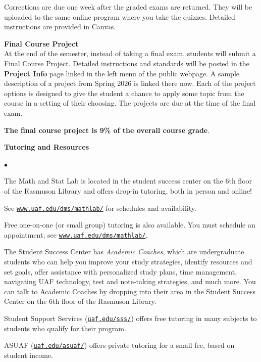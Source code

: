\documentclass[11pt]{article}
\renewcommand{\emph}[1]{\textsf{\textbf{#1}}}
\newcommand{\localhead}[1]{\par\smallskip\textbf{#1} \smallskip\nobreak\\}%
\def\heading#1{\localhead{\large\emph{#1}}}
\newenvironment{clist}%
{\bgroup\parskip 0pt\begin{list}{$\bullet$}{\partopsep 4pt\topsep 0pt\itemsep -2pt}}%
{\end{list}\egroup}%
\begin{document}
Corrections are due one week after the graded exams are returned. They will be uploaded to the same online program where you take the quizzes. Detailed instructions are provided in Canvas.

\heading{Final Course Project}
At the end of the semester, instead of taking a final exam, students will submit a Final
Course Project. Detailed instructions and standards will be posted in the \emph{Project Info} page linked in the left menu of the public webpage. A sample description of a project from Spring 2026 is linked there now. Each of the project options is designed to give the student a chance to apply some topic from the course in a setting of their choosing. The projects are due at the time of the final exam. 

\emph{The final course project is 9\% of the overall course grade}.

\heading{Tutoring and Resources}
\vskip -30pt\strut
\begin{clist}
    \item The Math and Stat Lab is located in the 
      student success center on the 6th floor of the Rasmuson Library and
      offers drop-in tutoring, both in person and online!

	See 	\href{http://www.uaf.edu/dms/mathlab/}{\texttt{www.uaf.edu/dms/mathlab/}} for schedules and availability.
	\item Free
one-on-one (or small group) tutoring is also available. You must schedule an
appointment; see \href{http://www.uaf.edu/dms/mathlab/}{\texttt{www.uaf.edu/dms/mathlab/}}.
\item The Student Success Center has {\it Academic Coaches}, which are undergraduate students who can help you  improve your study strategies, identify resources and set goals, offer assistance with personalized study plans, time management,  navigating UAF technology, test and note-taking strategies, and much more. You can talk to Academic Coaches by dropping into their area in the Student Success Center on the 6th floor of the Rasmuson Library.
	\item Student Support Services (\href{https://uaf.edu/sss/}{\texttt{uaf.edu/sss/}}) offers free tutoring in many subjects to students who qualify for their program.
	\item ASUAF (\href{https://uaf.edu/asuaf/}{\texttt{uaf.edu/asuaf/}}) offers private tutoring for a small fee, based on student income.\\
\end{clist}
\end{document}
